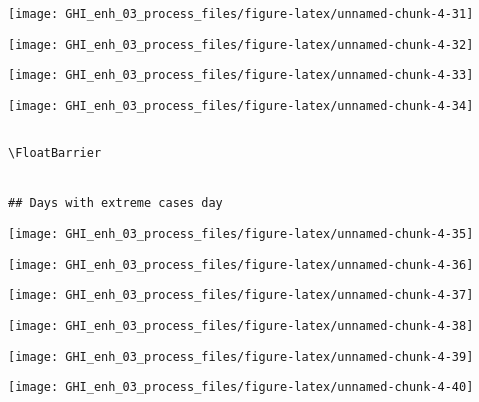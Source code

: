 \documentclass[
  10pt,
  a4paper,oneside]{article}
\begin{document}
\begin{center}\texttt{[image: GHI\_enh\_03\_process\_files/figure-latex/unnamed-chunk-4-31]} \end{center}

\begin{center}\texttt{[image: GHI\_enh\_03\_process\_files/figure-latex/unnamed-chunk-4-32]} \end{center}

\begin{center}\texttt{[image: GHI\_enh\_03\_process\_files/figure-latex/unnamed-chunk-4-33]} \end{center}

\begin{center}\texttt{[image: GHI\_enh\_03\_process\_files/figure-latex/unnamed-chunk-4-34]} \end{center}

\begin{verbatim}

\FloatBarrier


## Days with extreme cases day 
\end{verbatim}

\begin{center}\texttt{[image: GHI\_enh\_03\_process\_files/figure-latex/unnamed-chunk-4-35]} \end{center}

\begin{center}\texttt{[image: GHI\_enh\_03\_process\_files/figure-latex/unnamed-chunk-4-36]} \end{center}

\begin{center}\texttt{[image: GHI\_enh\_03\_process\_files/figure-latex/unnamed-chunk-4-37]} \end{center}

\begin{center}\texttt{[image: GHI\_enh\_03\_process\_files/figure-latex/unnamed-chunk-4-38]} \end{center}

\begin{center}\texttt{[image: GHI\_enh\_03\_process\_files/figure-latex/unnamed-chunk-4-39]} \end{center}

\begin{center}\texttt{[image: GHI\_enh\_03\_process\_files/figure-latex/unnamed-chunk-4-40]} \end{center}
\end{document}
